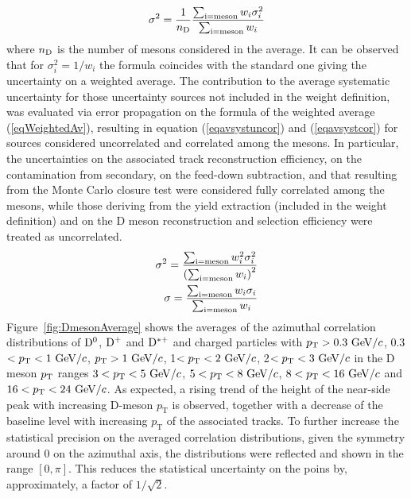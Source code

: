 \begin{equation}
  \sigma^{2}=\frac{1}{n_{\rm D}}\frac{\sum_{\rm i=meson}w_{i}\sigma^{2}_{i}}{\sum_{\rm i=meson}w_{i}}
\end{equation}
where $n_{\rm D}$ is the number of mesons considered in the average.
It can be observed that for $\sigma^{2}_{i}=1/w_{i}$ the formula coincides with the standard one giving the uncertainty on a weighted average.
The contribution to the average systematic uncertainty for those uncertainty sources not included in the weight definition, was evaluated via error propagation on the formula of the weighted average (\ref{eqWeightedAv}), resulting in equation (\ref{eqavsystuncor}) and (\ref{eqavsystcor}) for sources
considered uncorrelated and correlated among the mesons. In particular, the uncertainties on the associated track reconstruction efficiency, on the
contamination from secondary, on the feed-down subtraction, and that resulting from the Monte Carlo closure test were considered fully correlated among
the mesons, while those deriving from the yield extraction (included in the weight definition) and on the D meson reconstruction and selection efficiency were treated as uncorrelated.
\begin{eqnarray}
  \sigma^{2}=\frac{\sum_{\rm i=meson}w_{i}^{2}\sigma^{2}_{i}}{\left( \sum_{\rm i=meson}w_{i}\right)^{2}}  \label{eqavsystuncor}\\
  \sigma=\frac{\sum_{\rm i=meson}w_{i}\sigma_{i}}{ \sum_{\rm i=meson}w_{i}}   \label{eqavsystcor}
\end{eqnarray}
Figure~\ref{fig:DmesonAverage} shows the averages of the azimuthal correlation distributions of ${\rm D^0}$, ${\rm D^+}$ and ${\rm D^{*+}}$ and charged particles with $p_{\rm T}>0.3~\mathrm{GeV}/c$, 0.3$<p_{\rm T}<1~\mathrm{GeV}/c$, $p_{\rm T}>1~\mathrm{GeV}/c$, 1$<p_{\rm T}<2~\mathrm{GeV}/c$, 2$<p_{\rm T}<3~\mathrm{GeV}/c$ in the D meson $p_{\rm T}$ ranges $3<p_{\rm T}<5~\mathrm{GeV}/c$, $5<p_{\rm T}<8~\mathrm{GeV}/c$, $8<p_{\rm T}<16~\mathrm{GeV}/c$ and $16<p_{\rm T}<24~\mathrm{GeV}/c$.
As expected, a rising trend of the height of the near-side peak with increasing D-meson $p_\mathrm{T}$ is observed, together with a decrease of the baseline level with increasing $p_\mathrm{T}$ of the associated tracks.
To further increase the statistical precision on the averaged correlation distributions, given the symmetry around 0 on the azimuthal axis, the distributions were reflected and shown in the range $[0,\pi]$. This reduces the statistical uncertainty on the poins by, approximately, a factor of $1/\sqrt{2}$.
\clearpage

